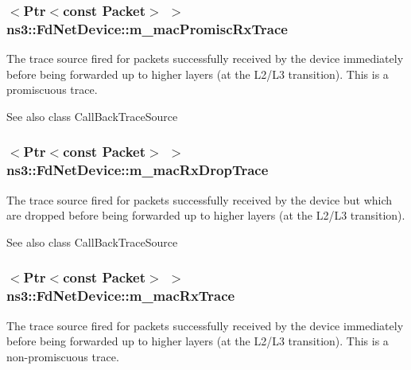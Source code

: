 \subsubsection[{\texorpdfstring{m\+\_\+mac\+Promisc\+Rx\+Trace}{m_macPromiscRxTrace}}]{$<${\bf Ptr}$<$const {\bf Packet}$>$ $>$ ns3\+::\+Fd\+Net\+Device\+::m\+\_\+mac\+Promisc\+Rx\+Trace\hspace{0.3cm}{\ttfamily [private]}}\hypertarget{classns3_1_1FdNetDevice_ac0fbee33fa2dc3d5349f33f794364fdb}{}\label{classns3_1_1FdNetDevice_ac0fbee33fa2dc3d5349f33f794364fdb}
The trace source fired for packets successfully received by the device immediately before being forwarded up to higher layers (at the L2/\+L3 transition). This is a promiscuous trace.

\begin{DoxySeeAlso}{See also}
class Call\+Back\+Trace\+Source 
\end{DoxySeeAlso}
\subsubsection[{\texorpdfstring{m\+\_\+mac\+Rx\+Drop\+Trace}{m_macRxDropTrace}}]{$<${\bf Ptr}$<$const {\bf Packet}$>$ $>$ ns3\+::\+Fd\+Net\+Device\+::m\+\_\+mac\+Rx\+Drop\+Trace\hspace{0.3cm}{\ttfamily [private]}}\hypertarget{classns3_1_1FdNetDevice_a1aa224dd6e458d104dda994ea7448f7d}{}\label{classns3_1_1FdNetDevice_a1aa224dd6e458d104dda994ea7448f7d}
The trace source fired for packets successfully received by the device but which are dropped before being forwarded up to higher layers (at the L2/\+L3 transition).

\begin{DoxySeeAlso}{See also}
class Call\+Back\+Trace\+Source 
\end{DoxySeeAlso}
\subsubsection[{\texorpdfstring{m\+\_\+mac\+Rx\+Trace}{m_macRxTrace}}]{$<${\bf Ptr}$<$const {\bf Packet}$>$ $>$ ns3\+::\+Fd\+Net\+Device\+::m\+\_\+mac\+Rx\+Trace\hspace{0.3cm}{\ttfamily [private]}}\hypertarget{classns3_1_1FdNetDevice_a5d526995e92ac4957170d9b8a680bad1}{}\label{classns3_1_1FdNetDevice_a5d526995e92ac4957170d9b8a680bad1}
The trace source fired for packets successfully received by the device immediately before being forwarded up to higher layers (at the L2/\+L3 transition). This is a non-\/promiscuous trace.

